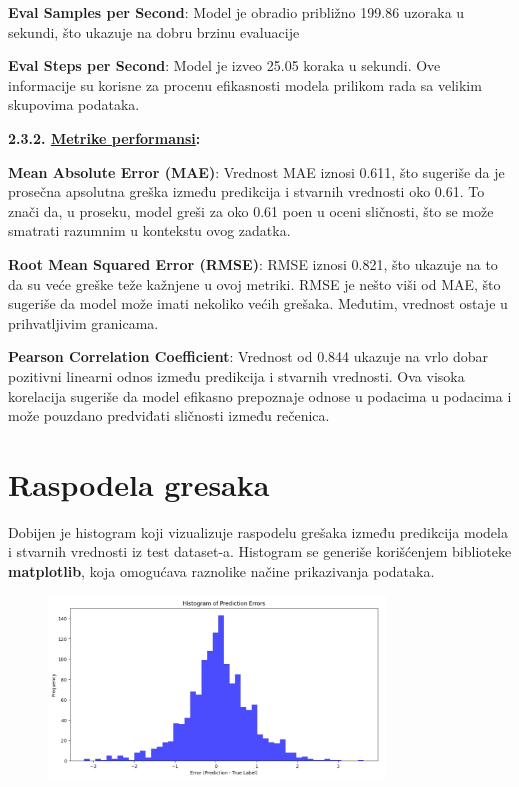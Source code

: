 \documentclass{article}
\begin{document}
\textbf{Eval Samples per Second}: Model je obradio približno 199.86 uzoraka u sekundi, što ukazuje na dobru brzinu evaluacije

\textbf{Eval Steps per Second}: Model je izveo 25.05 koraka u sekundi. Ove informacije su korisne za procenu efikasnosti modela prilikom rada sa velikim skupovima podataka.

\vspace{1em}
\textbf{2.3.2. \underline{Metrike performansi}:}
\vspace{1em}

\textbf{Mean Absolute Error (MAE)}: Vrednost MAE iznosi 0.611, što sugeriše da je prosečna apsolutna greška između predikcija i stvarnih vrednosti oko 0.61. To znači da, u proseku, model greši za oko 0.61 poen u oceni sličnosti, što se može smatrati razumnim u kontekstu ovog zadatka.

\textbf{Root Mean Squared Error (RMSE)}: RMSE iznosi 0.821, što ukazuje na to da su veće greške teže kažnjene u ovoj metriki. RMSE je nešto viši od MAE, što sugeriše da model može imati nekoliko većih grešaka. Međutim, vrednost ostaje u prihvatljivim granicama.

\textbf{Pearson Correlation Coefficient}: Vrednost od 0.844 ukazuje na vrlo dobar pozitivni linearni odnos između predikcija i stvarnih vrednosti. Ova visoka korelacija sugeriše da model efikasno prepoznaje odnose u podacima u podacima i može pouzdano predviđati sličnosti između rečenica.

\section{Raspodela gresaka}

Dobijen je histogram koji vizualizuje raspodelu grešaka između predikcija modela i stvarnih vrednosti iz test dataset-a. Histogram se generiše korišćenjem biblioteke \textbf{matplotlib}, koja omogućava raznolike načine prikazivanja podataka.

\newpage

\begin{figure}[t]
    \centering 
    \includegraphics[width=0.8\textwidth]{ri1.jpeg} 
\end{figure}
\end{document}
